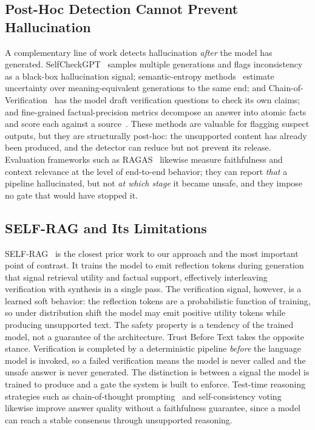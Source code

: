 \documentclass[conference]{IEEEtran}
\begin{document}
\subsection{Post-Hoc Detection Cannot Prevent Hallucination}
A complementary line of work detects hallucination \textit{after} the
model has generated. SelfCheckGPT~\cite{manakul2023selfcheck} samples
multiple generations and flags inconsistency as a black-box hallucination
signal; semantic-entropy methods~\cite{farquhar2024semantic} estimate
uncertainty over meaning-equivalent generations to the same end; and
Chain-of-Verification~\cite{dhuliawala2023cov} has the model draft
verification questions to check its own claims; and fine-grained
factual-precision metrics decompose an answer into atomic facts and score
each against a source~\cite{min2023factscore}. These methods are valuable
for flagging suspect outputs, but they are structurally post-hoc: the
unsupported content has already been produced, and the detector can reduce
but not prevent its release. Evaluation frameworks such as
RAGAS~\cite{es2023ragas} likewise measure faithfulness and context
relevance at the level of end-to-end behavior; they can report
\textit{that} a pipeline hallucinated, but not \textit{at which stage} it
became unsafe, and they impose no gate that would have stopped it.

\subsection{SELF-RAG and Its Limitations}
SELF-RAG~\cite{asai2023selfrag} is the closest prior work to our approach
and the most important point of contrast. It trains the model to emit
reflection tokens during generation that signal retrieval utility and
factual support, effectively interleaving verification with synthesis in a
single pass. The verification signal, however, is a learned soft behavior:
the reflection tokens are a probabilistic function of training, so under
distribution shift the model may emit positive utility tokens while
producing unsupported text. The safety property is a tendency of the
trained model, not a guarantee of the architecture. Trust Before Text
takes the opposite stance. Verification is completed by a deterministic
pipeline \textit{before} the language model is invoked, so a failed
verification means the model is never called and the unsafe answer is
never generated. The distinction is between a signal the model is trained
to produce and a gate the system is built to enforce. Test-time reasoning
strategies such as chain-of-thought prompting~\cite{wei2022cot} and
self-consistency voting~\cite{wang2023selfconsistency} likewise improve
answer quality without a faithfulness guarantee, since a model can reach a
stable consensus through unsupported reasoning.
\end{document}
